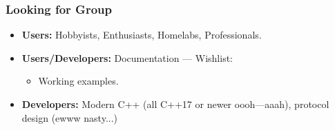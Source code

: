 \begin{frame}
	\frametitle{Looking for Group}
	\begin{itemize}
		\item \textbf{Users:} Hobbyists, Enthusiasts, Homelabs, Professionals. \vspace{1em}
		\item \textbf{Users/Developers:} Documentation --- Wishlist:
		\begin{itemize}
			\item Working examples.
		\end{itemize}\vspace{1em}
		\item \textbf{Developers:} Modern C++ (\scriptsize all C++17 or newer oooh---aaah), \normalsize protocol design (\scriptsize ewww nasty...)
	\end{itemize}
\end{frame}